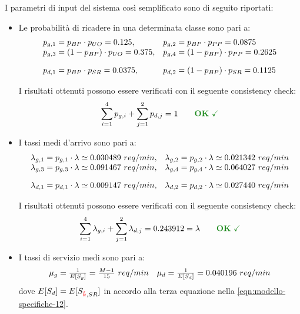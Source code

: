 I parametri di input del sistema così semplificato sono di seguito riportati:
\begin{itemize}
\item Le probabilità di ricadere in una determinata classe sono pari a:
\begin{equation}
\begin{array}{l l}
p_{g,1} = p_{BP} \cdot p_{UO} = 0.125, & p_{g,2} = p_{BP} \cdot p_{PP} = 0.0875 \\
p_{g,3} = (1-p_{BP}) \cdot p_{UO} = 0.375, & p_{g,4} = (1-p_{BP}) \cdot p_{PP} = 0.2625 \\[1em]
p_{d,1} = p_{BP} \cdot p_{SR} = 0.0375, & p_{d,2} = (1-p_{BP}) \cdot p_{SR} = 0.1125
\end{array}
\end{equation}

I risultati ottenuti possono essere verificati con il seguente consistency check:
\begin{equation}
\sum_{i=1}^{4} p_{g,i} + \sum_{j=1}^2 p_{d,j} = 1\qquad \text{\color{forestgreen}\textbf{OK} \checkmark}
\end{equation}
\item I tassi medi d'arrivo sono pari a:
\begin{equation}
\begin{array}{l l}
\lambda_{g,1} = p_{g,1} \cdot \lambda \simeq 0.030489\ req/min, & \lambda_{g,2} = p_{g,2} \cdot \lambda \simeq 0.021342\ req/min \\
\lambda_{g,3} = p_{g,3} \cdot \lambda \simeq 0.091467\ req/min, & \lambda_{g,4} = p_{g,4} \cdot \lambda \simeq 0.064027\ req/min \\[1em]
\lambda_{d,1} = p_{d,1} \cdot \lambda \simeq 0.009147\ req/min, & \lambda_{d,2} = p_{d,2} \cdot \lambda \simeq 0.027440\ req/min \\
\end{array}
\end{equation}

I risultati ottenuti possono essere verificati con il seguente consistency check:
\begin{equation}
\sum_{i=1}^{4} \lambda_{g,i} + \sum_{j=1}^2 \lambda_{d,j} = 0.243912 = \lambda\qquad \text{\color{forestgreen}\textbf{OK} \checkmark}
\end{equation}

\item I tassi di servizio medi sono pari a:
\begin{equation}
\begin{array}{l l}
\mu_g = \frac{1}{E[S_g]} = \frac{M-1}{15}\ req/min & \mu_d = \frac{1}{E[S_d]} = 0.040196\ req/min
\end{array}
\end{equation}
dove $E[S_d] = E[S_{{\color{red}\hat{k}}{}, SR}]$ in accordo alla terza equazione nella \ref{eqn:modello-specifiche-12}.


\end{itemize}
